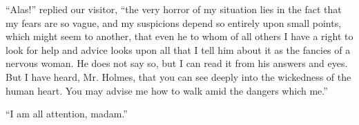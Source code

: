 \documentclass{fiche}
\begin{document}
\begin{texte}
``Alas!'' replied our visitor, ``the very horror of my situation lies in the fact that my
fears are so vague, and my suspicions depend so entirely upon small points, which might seem
 to another, that even he to whom of all others I have a
right to look for help and advice looks upon all that I tell him about it as the fancies of a
nervous woman. He does not say so, but I can read it from his  answers and  eyes. But I have heard, Mr. Holmes,
that you can see deeply into the  wickedness of the human
heart. You may advise me how to walk amid the dangers which
 me.''

``I am all attention, madam.''
\end{texte}

\end{document}
